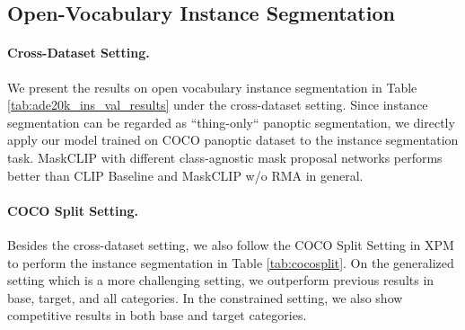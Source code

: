 \documentclass{article}
\theoremstyle{plain}
\theoremstyle{definition}
\theoremstyle{remark}
\begin{document}
\subsection{Open-Vocabulary Instance Segmentation}

\paragraph{Cross-Dataset Setting.} We present the results on open vocabulary instance segmentation in Table \ref{tab:ade20k_ins_val_results} under the cross-dataset setting. Since instance segmentation can be regarded as ``thing-only`` panoptic segmentation, we directly apply our model trained on COCO panoptic dataset to the instance segmentation task. MaskCLIP with different class-agnostic mask proposal networks performs better than CLIP Baseline and MaskCLIP w/o RMA in general. 

\begin{table}[H]
\begin{center}
\caption{\small \textbf{Results on open-vocabulary instance segmentation under the cross-dataset setting.} }
\label{tab:ade20k_ins_val_results}
\end{center}
\end{table}


\paragraph{COCO Split Setting.} Besides the cross-dataset setting, we also follow the COCO Split Setting in XPM\citep{huynh2022open} to perform the instance segmentation in Table \ref{tab:cocosplit}. On the generalized setting which is a more challenging setting, we outperform previous results in base, target, and all categories. In the constrained setting, we also show competitive results in both base and target categories.
\end{document}
